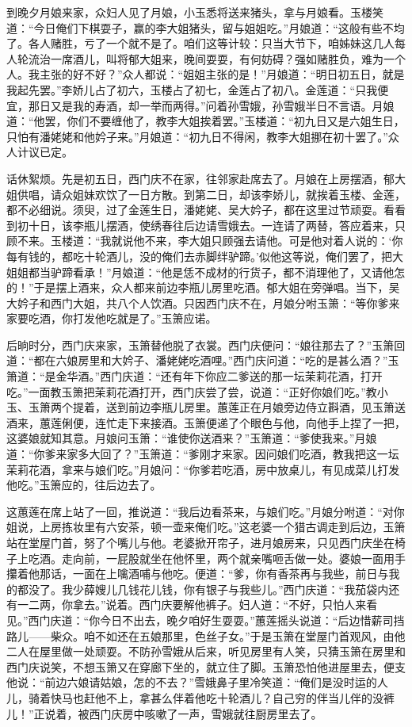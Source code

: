 到晚夕月娘来家，众妇人见了月娘，小玉悉将送来猪头，拿与月娘看。玉楼笑道：“今日俺们下棋耍子，赢的李大姐猪头，留与姐姐吃。”月娘道：“这般有些不均了。各人赌胜，亏了一个就不是了。咱们这等计较：只当大节下，咱姊妹这几人每人轮流治一席酒儿，叫将郁大姐来，晚间耍耍，有何妨碍？强如赌胜负，难为一个人。我主张的好不好？”众人都说：“姐姐主张的是！”月娘道：“明日初五日，就是我起先罢。”李娇儿占了初六，玉楼占了初七，金莲占了初八。金莲道：“只我便宜，那日又是我的寿酒，却一举而两得。”问着孙雪娥，孙雪娥半日不言语。月娘道：“他罢，你们不要缠他了，教李大姐挨着罢。”玉楼道：“初九日又是六姐生日，只怕有潘姥姥和他妗子来。”月娘道：“初九日不得闲，教李大姐挪在初十罢了。”众人计议已定。

话休絮烦。先是初五日，西门庆不在家，往邻家赴席去了。月娘在上房摆酒，郁大姐供唱，请众姐妹欢饮了一日方散。到第二日，却该李娇儿，就挨着玉楼、金莲，都不必细说。须臾，过了金莲生日，潘姥姥、吴大妗子，都在这里过节顽耍。看看到初十日，该李瓶儿摆酒，使绣春往后边请雪娥去。一连请了两替，答应着来，只顾不来。玉楼道：“我就说他不来，李大姐只顾强去请他。可是他对着人说的：‘你每有钱的，都吃十轮酒儿，没的俺们去赤脚绊驴蹄。’似他这等说，俺们罢了，把大姐姐都当驴蹄看承！”月娘道：“他是恁不成材的行货子，都不消理他了，又请他怎的！”于是摆上酒来，众人都来前边李瓶儿房里吃酒。郁大姐在旁弹唱。当下，吴大妗子和西门大姐，共八个人饮酒。只因西门庆不在，月娘分咐玉箫：“等你爹来家要吃酒，你打发他吃就是了。”玉箫应诺。

后晌时分，西门庆来家，玉箫替他脱了衣裳。西门庆便问：“娘往那去了？”玉箫回道：“都在六娘房里和大妗子、潘姥姥吃酒哩。”西门庆问道：“吃的是甚么酒？”玉箫道：“是金华酒。”西门庆道：“还有年下你应二爹送的那一坛茉莉花酒，打开吃。”一面教玉箫把茉莉花酒打开，西门庆尝了尝，说道：“正好你娘们吃。”教小玉、玉箫两个提着，送到前边李瓶儿房里。蕙莲正在月娘旁边侍立斟酒，见玉箫送酒来，蕙莲俐便，连忙走下来接酒。玉箫便递了个眼色与他，向他手上捏了一把，这婆娘就知其意。月娘问玉箫：“谁使你送酒来？”玉箫道：“爹使我来。”月娘道：“你爹来家多大回了？”玉箫道：“爹刚才来家。因问娘们吃酒，教我把这一坛茉莉花酒，拿来与娘们吃。”月娘问：“你爹若吃酒，房中放桌儿，有见成菜儿打发他吃。”玉箫应的，往后边去了。

这蕙莲在席上站了一回，推说道：“我后边看茶来，与娘们吃。”月娘分咐道：“对你姐说，上房拣妆里有六安茶，顿一壶来俺们吃。”这老婆一个猎古调走到后边，玉箫站在堂屋门首，努了个嘴儿与他。老婆掀开帘子，进月娘房来，只见西门庆坐在椅子上吃酒。走向前，一屁股就坐在他怀里，两个就亲嘴咂舌做一处。婆娘一面用手攥着他那话，一面在上噙酒哺与他吃。便道：“爹，你有香茶再与我些，前日与我的都没了。我少薛嫂儿几钱花儿钱，你有银子与我些儿。”西门庆道：“我茄袋内还有一二两，你拿去。”说着。西门庆要解他裤子。妇人道：“不好，只怕人来看见。”西门庆道：“你今日不出去，晚夕咱好生耍耍。”蕙莲摇头说道：“后边惜薪司挡路儿——柴众。咱不如还在五娘那里，色丝子女。”于是玉箫在堂屋门首观风，由他二人在屋里做一处顽耍。不防孙雪娥从后来，听见房里有人笑，只猜玉箫在房里和西门庆说笑，不想玉箫又在穿廊下坐的，就立住了脚。玉箫恐怕他进屋里去，便支他说：“前边六娘请姑娘，怎的不去？”雪娥鼻子里冷笑道：“俺们是没时运的人儿，骑着快马也赶他不上，拿甚么伴着他吃十轮酒儿？自己穷的伴当儿伴的没裤儿！”正说着，被西门庆房中咳嗽了一声，雪娥就往厨房里去了。

